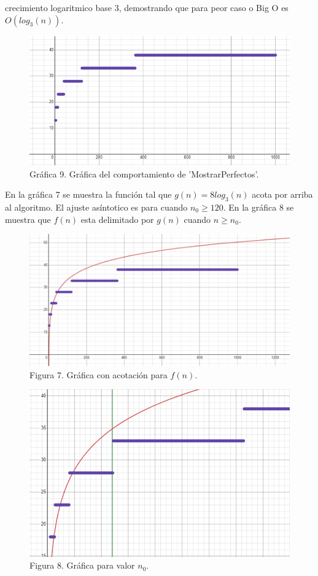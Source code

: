 \documentclass[12pt,twoside]{article}
\begin{document}
crecimiento logaritmico base 3, demostrando que para peor caso o Big O es
$O(log_3(n))$.
\begin{figure}[h]
  \begin{center}
    \includegraphics[width=0.7\linewidth]{images/busquedarecursivaworstcase.png}
    \\
    Gráfica 9. Gráfica del comportamiento de 'MostrarPerfectos'.
  \end{center}
\end{figure}
\newpage
En la gráfica 7 se muestra la función tal que $g(n)=8log_3(n)$ acota por arriba al algoritmo. El ajuste asíntotico es para cuando $n_0\geq 120$. En la gráfica 8 se muestra que $f(n)$ esta delimitado por $g(n)$ cuando $n\geq n_0$.

\begin{figure}[h]
  \begin{center}
    \includegraphics[width=0.7\linewidth]{images/busquedarecursivaworstcasegn.png}
    \\
    Figura 7. Gráfica con acotación para $f(n)$.
  \end{center}
\end{figure}
\begin{figure}[h]
  \begin{center}
    \includegraphics[width=0.7\linewidth]{images/busquedarecursivaworstcasegncota.png}
    \\
    Figura 8. Gráfica para valor $n_0$.
  \end{center}
\end{figure}
\end{document}
